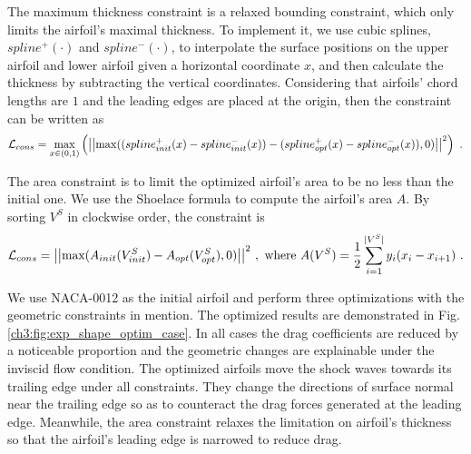 The maximum thickness constraint is a relaxed bounding constraint, which only limits the airfoil's maximal thickness.
To implement it, we use cubic splines, $spline^+(\cdot)$ and $spline^-(\cdot)$, to interpolate the surface positions on the upper airfoil and lower airfoil given a horizontal coordinate $x$, and then calculate the thickness by subtracting the vertical coordinates.
Considering that airfoils' chord lengths are $1$ and the leading edges are placed at the origin, then the constraint can be written as
\begin{equation}
    {\mathcal{L}_{cons}} = \mathop {\max }\limits_{x \in (0,1)} \left( {\left|\left|\max ((spline_{init}^ + (x) - spline_{init}^ - (x)) - (spline_{opt}^ + (x) - spline_{opt}^ - (x)),0)\right|\right|^2} \right)\,\,.
\end{equation}

The area constraint is to limit the optimized airfoil's area to be no less than the initial one.
We use the Shoelace formula to compute the airfoil's area $A$.
By sorting $V^S$ in clockwise order, the constraint is
\begin{equation}
    {\mathcal{L}_{cons}} = \left|\left|\max (A_{init}(V_{init}^S) - A_{opt}(V_{opt}^S),0)\right|\right|^2\,,\,\,\text{where}\,\,A({V^S}) = \frac{1}{2}\sum\limits_{i = 1}^{|{V^S}|} {{y_i}({x_i} - {x_{i + 1}})} \,\,.
    \label{ch3:eq:constraint_area}
\end{equation}

We use NACA-0012 as the initial airfoil and perform three optimizations with the geometric constraints in mention.
The optimized results are demonstrated in Fig.\ref{ch3:fig:exp_shape_optim_case}.
In all cases the drag coefficients are reduced by a noticeable proportion and the geometric changes are explainable under the inviscid flow condition.
The optimized airfoils move the shock waves towards its trailing edge under all constraints.
They change the directions of surface normal near the trailing edge so as to counteract the drag forces generated at the leading edge.
Meanwhile, the area constraint relaxes the limitation on airfoil's thickness so that the airfoil's leading edge is narrowed to reduce drag.

